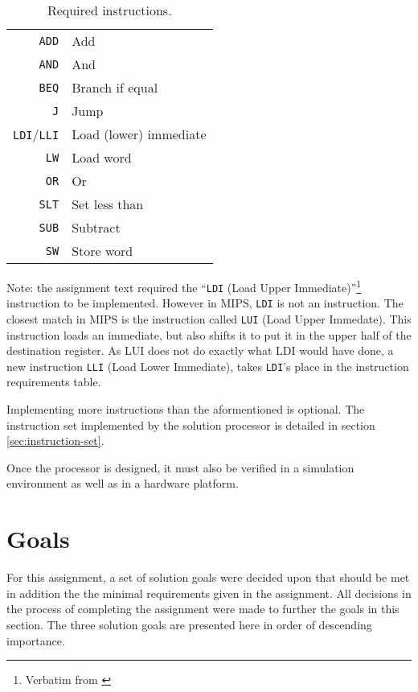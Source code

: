 \begin{table}
    \begin{center}
        \begin{tabular}{r|l}
            \texttt{ADD} & Add \\
            \texttt{AND} & And \\
            \texttt{BEQ} & Branch if equal \\
            \texttt{J} & Jump \\
            \texttt{LDI}/\texttt{LLI} & Load (lower) immediate \\
            \texttt{LW} & Load word \\
            \texttt{OR} & Or \\
            \texttt{SLT} & Set less than \\
            \texttt{SUB} & Subtract \\
            \texttt{SW} & Store word \\
            \hline
        \end{tabular}
        \smallskip
        \smallskip
        \caption{Required instructions.}
        \label{table:required-instructions}
    \end{center}
\end{table}

Note: the assignment text required the ``\texttt{LDI} (Load Upper Immediate)''\footnote{Verbatim from \cite[p.114]{compendium}} instruction to be implemented.
However in MIPS, \texttt{LDI} is not an instruction.
The closest match in MIPS is the instruction called \texttt{LUI} (Load Upper Immedate).
This instruction loads an immediate, but also shifts it to put it in the upper half of the destination register.
As LUI does not do exactly what LDI would have done, a new instruction \texttt{LLI} (Load Lower Immediate), takes \texttt{LDI}'s place in the instruction requirements table.

Implementing more instructions than the aformentioned is optional.
The instruction set implemented by the solution processor is detailed in section \vref{sec:instruction-set}.

Once the processor is designed, it must also be verified in a simulation environment as well as in a hardware platform.

\section{Goals}

For this assignment, a set of solution goals were decided upon that should be met in addition the the minimal requirements given in the assignment.
All decisions in the process of completing the assignment were made to further the goals in this section.
The three solution goals are presented here in order of descending importance.

